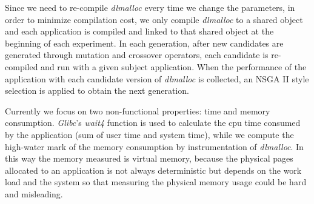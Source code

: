 Since we need to re-compile \emph{dlmalloc} every time we change the parameters, in order to minimize compilation cost, we only compile \emph{dlmalloc} to a shared object and each application is compiled and linked to that shared object at the beginning of each experiment. In each generation, after new candidates are generated through mutation and crossover operators, each candidate is re-compiled and run with a given subject application. When the performance of the application with each candidate version of \emph{dlmalloc} is collected, an NSGA II style selection is applied to obtain the next generation.

Currently we focus on two non-functional properties: time and memory consumption. \emph{Glibc}'s \emph{wait4} function is used to calculate the cpu time consumed by the application (sum of user time and system time), while we compute the high-water mark of the memory consumption by instrumentation of \emph{dlmalloc}. In this way the memory measured is virtual memory, because the physical pages allocated to an application is not always deterministic but depends on the work load and the system so that measuring the physical memory usage could be hard and misleading.
